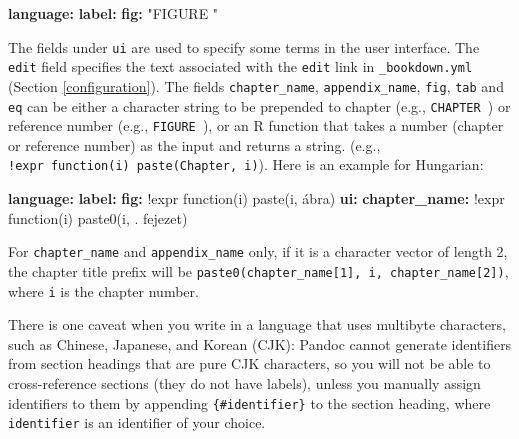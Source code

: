 \documentclass[
  12pt,
]{krantz}
\newenvironment{Shaded}{\begin{snugshade}}{\end{snugshade}}
\newcommand{\AttributeTok}[1]{\textcolor[rgb]{0.13,0.29,0.53}{#1}}
\newcommand{\FunctionTok}[1]{\textcolor[rgb]{0.13,0.29,0.53}{\textbf{#1}}}
\newcommand{\KeywordTok}[1]{\textcolor[rgb]{0.13,0.29,0.53}{\textbf{#1}}}
\newcommand{\StringTok}[1]{\textcolor[rgb]{0.31,0.60,0.02}{#1}}
\theoremstyle{definition}
\theoremstyle{definition}
\theoremstyle{definition}
\theoremstyle{definition}
\theoremstyle{remark}
\begin{document}
\begin{Shaded}
\begin{Highlighting}[]
\FunctionTok{language}\KeywordTok{:}
\AttributeTok{  }\FunctionTok{label}\KeywordTok{:}
\AttributeTok{    }\FunctionTok{fig}\KeywordTok{:}\AttributeTok{ }\StringTok{"FIGURE "}
\end{Highlighting}
\end{Shaded}

The fields under \texttt{ui} are used to specify some terms in the user interface. The \texttt{edit} field specifies the text associated with the \texttt{edit} link in \texttt{\_bookdown.yml} (Section \ref{configuration}). The fields \texttt{chapter\_name}, \texttt{appendix\_name}, \texttt{fig}, \texttt{tab} and \texttt{eq} can be either a character string to be prepended to chapter (e.g., \texttt{\textquotesingle{}CHAPTER\ \textquotesingle{}}) or reference number (e.g., \texttt{\textquotesingle{}FIGURE\ \textquotesingle{}}), or an R function that takes a number (chapter or reference number) as the input and returns a string. (e.g., \texttt{!expr\ function(i)\ paste(\textquotesingle{}Chapter\textquotesingle{},\ i)}). Here is an example for Hungarian:

\begin{Shaded}
\begin{Highlighting}[]
\FunctionTok{language}\KeywordTok{:}
\AttributeTok{  }\FunctionTok{label}\KeywordTok{:}
\AttributeTok{    }\FunctionTok{fig}\KeywordTok{:}\AttributeTok{ !expr function(i) paste(i, \textquotesingle{}ábra\textquotesingle{})}
\AttributeTok{  }\FunctionTok{ui}\KeywordTok{:}
\AttributeTok{    }\FunctionTok{chapter\_name}\KeywordTok{:}\AttributeTok{ !expr function(i) paste0(i, \textquotesingle{}. fejezet\textquotesingle{})}
\end{Highlighting}
\end{Shaded}

For \texttt{chapter\_name} and \texttt{appendix\_name} only, if it is a character vector of length 2, the chapter title prefix will be \texttt{paste0(chapter\_name{[}1{]},\ i,\ chapter\_name{[}2{]})}, where \texttt{i} is the chapter number.

There is one caveat when you write in a language that uses multibyte characters, such as Chinese, Japanese, and Korean (CJK): Pandoc cannot generate identifiers from section headings that are pure CJK characters, so you will not be able to cross-reference sections (they do not have labels), unless you manually assign identifiers to them by appending \texttt{\{\#identifier\}} to the section heading, where \texttt{identifier} is an identifier of your choice.
\end{document}
